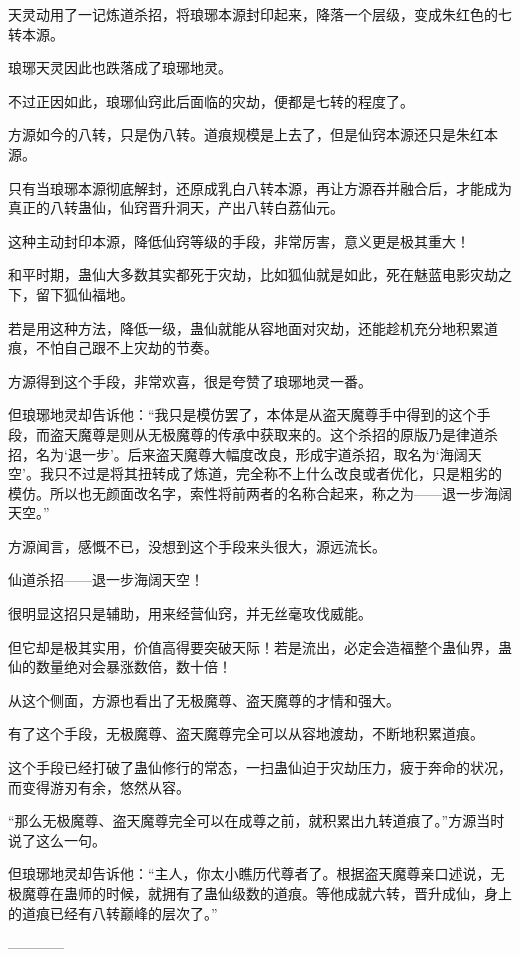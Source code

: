 \begin{this_body}
天灵动用了一记炼道杀招，将琅琊本源封印起来，降落一个层级，变成朱红色的七转本源。

琅琊天灵因此也跌落成了琅琊地灵。

不过正因如此，琅琊仙窍此后面临的灾劫，便都是七转的程度了。

方源如今的八转，只是伪八转。道痕规模是上去了，但是仙窍本源还只是朱红本源。

只有当琅琊本源彻底解封，还原成乳白八转本源，再让方源吞并融合后，才能成为真正的八转蛊仙，仙窍晋升洞天，产出八转白荔仙元。

这种主动封印本源，降低仙窍等级的手段，非常厉害，意义更是极其重大！

和平时期，蛊仙大多数其实都死于灾劫，比如狐仙就是如此，死在魅蓝电影灾劫之下，留下狐仙福地。

若是用这种方法，降低一级，蛊仙就能从容地面对灾劫，还能趁机充分地积累道痕，不怕自己跟不上灾劫的节奏。

方源得到这个手段，非常欢喜，很是夸赞了琅琊地灵一番。

但琅琊地灵却告诉他：“我只是模仿罢了，本体是从盗天魔尊手中得到的这个手段，而盗天魔尊是则从无极魔尊的传承中获取来的。这个杀招的原版乃是律道杀招，名为‘退一步’。后来盗天魔尊大幅度改良，形成宇道杀招，取名为‘海阔天空’。我只不过是将其扭转成了炼道，完全称不上什么改良或者优化，只是粗劣的模仿。所以也无颜面改名字，索性将前两者的名称合起来，称之为——退一步海阔天空。”

方源闻言，感慨不已，没想到这个手段来头很大，源远流长。

仙道杀招——退一步海阔天空！

很明显这招只是辅助，用来经营仙窍，并无丝毫攻伐威能。

但它却是极其实用，价值高得要突破天际！若是流出，必定会造福整个蛊仙界，蛊仙的数量绝对会暴涨数倍，数十倍！

从这个侧面，方源也看出了无极魔尊、盗天魔尊的才情和强大。

有了这个手段，无极魔尊、盗天魔尊完全可以从容地渡劫，不断地积累道痕。

这个手段已经打破了蛊仙修行的常态，一扫蛊仙迫于灾劫压力，疲于奔命的状况，而变得游刃有余，悠然从容。

“那么无极魔尊、盗天魔尊完全可以在成尊之前，就积累出九转道痕了。”方源当时说了这么一句。

但琅琊地灵却告诉他：“主人，你太小瞧历代尊者了。根据盗天魔尊亲口述说，无极魔尊在蛊师的时候，就拥有了蛊仙级数的道痕。等他成就六转，晋升成仙，身上的道痕已经有八转巅峰的层次了。”

------------

\end{this_body}

